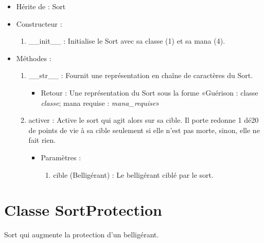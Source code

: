 \documentclass[12pt,pdftex,oneside]{article}
\begin{document}
  \begin{itemize}
  \item Hérite de : Sort


  \item Constructeur : 

  \begin{enumerate}
  \item \_\_init\_\_ : Initialise le Sort avec sa classe (1) et sa mana (4).

  \end{enumerate}

  \item Méthodes : 

    \begin{enumerate}
    \item \_\_str\_\_ : Fournit une représentation en chaîne de caractères du Sort.
      \begin{itemize}
      \item Retour : Une représentation du Sort sous la forme «Guérison : classe \emph{classe}; mana requise : \emph{mana\_requise}»
      \end{itemize}
    \item activer : Active le sort qui agit alors sur sa cible. Il porte redonne
      1 dé20 de points de vie à sa cible seulement si elle n'est pas morte, sinon, elle ne fait rien.
      \begin{itemize}
      \item Paramètres : 
        \begin{enumerate}
        \item cible (Belligérant) : Le belligérant ciblé par le sort.
        \end{enumerate}
      \end{itemize}

    \end{enumerate}
  \end{itemize}

  \section {Classe SortProtection}

  Sort qui augmente la protection d'un belligérant.
\end{document}
